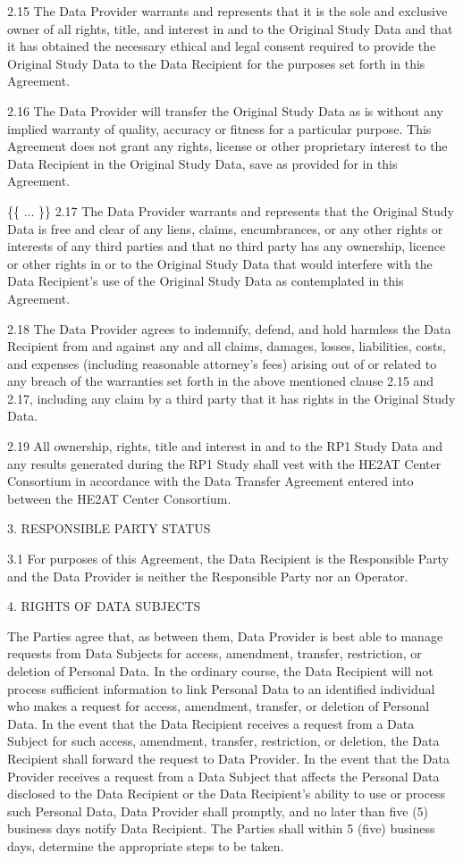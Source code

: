 \documentclass[12pt,letterpaper]{article}
\begin{document}
2.15	The Data Provider warrants and represents that it is the sole and exclusive owner of all rights, title, and interest in and to the Original Study Data and that it has obtained the necessary ethical and legal consent required to provide the Original Study Data to the Data Recipient for the purposes set forth in this Agreement.

2.16	The Data Provider will transfer the Original Study Data as is without any implied warranty of quality, accuracy or fitness for a particular purpose. This Agreement does not grant any rights, license or other proprietary interest to the Data Recipient in the Original Study Data, save as provided for in this Agreement. 

\{\{ ... \}\} 2.17	The Data Provider warrants and represents that the Original Study Data is free and clear of any liens, claims, encumbrances, or any other rights or interests of any third parties and that no third party has any ownership, licence or other rights in or to the Original Study Data that would interfere with the Data Recipient’s use of the Original Study Data as contemplated in this Agreement. 

2.18	The Data Provider agrees to indemnify, defend, and hold harmless the Data Recipient from and against any and all claims, damages, losses, liabilities, costs, and expenses (including reasonable attorney’s fees) arising out of or related to any breach of the warranties set forth in the above mentioned clause 2.15 and 2.17, including any claim by a third party that it has rights in the Original Study Data.

2.19	All ownership, rights, title and interest in and to the RP1 Study Data and any results generated during the RP1 Study shall vest with the HE2AT Center Consortium  in accordance with the Data Transfer Agreement entered into between the HE2AT Center Consortium.

3.	RESPONSIBLE PARTY STATUS	

3.1	For purposes of this Agreement, the Data Recipient is the Responsible Party and the Data Provider is neither the Responsible Party nor an Operator. 

4.	RIGHTS OF DATA SUBJECTS

                The Parties agree that, as between them, Data Provider is best able to manage requests from 	Data Subjects for access, amendment, transfer, restriction, or deletion of Personal Data. In 	the ordinary course, the Data Recipient will not process sufficient information to link Personal 	Data to an identified individual who makes a request for access, amendment, transfer, or 	deletion of Personal Data. In the event that the Data Recipient receives a request from a Data 	Subject for such access, amendment, transfer, restriction, or deletion, the Data Recipient   	shall forward the request to Data Provider. In the event that the Data Provider receives a    	request from a Data Subject that affects the Personal Data disclosed to the Data Recipient or 	the Data Recipient’s ability to use or process such Personal Data, Data Provider shall 	promptly, and no later than five (5) business days notify Data Recipient. The Parties shall   	within 5 (five) business days, determine the appropriate steps to be taken. 
\end{document}
